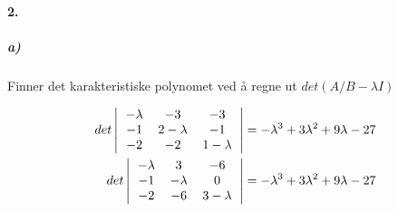 \documentclass[11pt, A4paper,norsk]{article}
\begin{document}
		\paragraph{2.}
			\subparagraph{a)}
				\begin{flushleft}
Finner det karakteristiske polynomet ved å regne ut $det(A/B - \lambda I)$
				\end{flushleft}
				\begin{align}
det \left|
\begin{tabular} { ccc }
$- \lambda$ &$ -3 $&$ -3$ \\
$-1$ & $2 - \lambda$ & $-1$ \\
$-2$ & $-2$ & $1 - \lambda$
\end{tabular}
\right| = - \lambda^3 + 3 \lambda^2 + 9 \lambda - 27 \\
det \left|
\begin{tabular} { ccc }
$- \lambda$ & 3 & $-6$ \\
$-1$ & $- \lambda$ & $0$ \\
$-2$ & $-6$ & $3 - \lambda$
\end{tabular}
\right| = - \lambda^3 + 3 \lambda^2 + 9 \lambda - 27
				\end{align}
\end{document}
